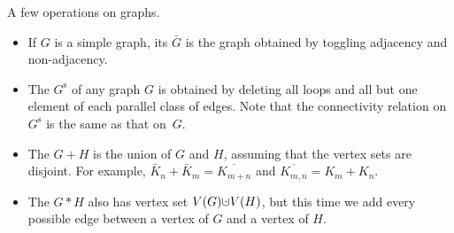 A few operations on graphs.
\begin{itemize}
\item If $G$ is a simple graph, its  $\bar G$ is the graph obtained by toggling adjacency and non-adjacency.
\item The  $G^{\text{s}}$ of any graph $G$ is obtained by deleting all loops and all but one element of each parallel class of edges.  Note that the connectivity relation on $G^{\text{s}}$ is the same as that on~$G$.
\item The  $G+H$ is the union of $G$ and $H$, assuming that the vertex sets are disjoint.
For example, $\bar K_n+\bar K_m=\overline{K_{m+n}}$ and $\overline{K_{m,n}}=K_m+K_n$.
\item The  $G*H$ also has vertex set $V(G)\dju V(H)$, but this time we add every possible edge between a vertex of $G$ and a vertex of $H$.
\end{itemize}



